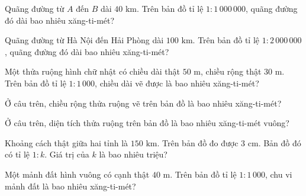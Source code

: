 \begin{ex}
  Quãng đường từ $A$ đến $B$ dài $40\text{ km}$. Trên bản đồ tỉ lệ $1 : 1\,000\,000$, quãng đường đó dài bao nhiêu xăng-ti-mét?
\end{ex}

\begin{ex}
  Quãng đường từ Hà Nội đến Hải Phòng dài $100\text{ km}$. Trên bản đồ tỉ lệ $1 : 2\,000\,000$, quãng đường đó dài bao nhiêu xăng-ti-mét?
\end{ex}

\begin{ex}
  Một thửa ruộng hình chữ nhật có chiều dài thật $50\text{ m}$, chiều rộng thật $30\text{ m}$. Trên bản đồ tỉ lệ $1 : 1\,000$, chiều dài vẽ được là bao nhiêu xăng-ti-mét?
\end{ex}

\begin{ex}
  Ở câu trên, chiều rộng thửa ruộng vẽ trên bản đồ là bao nhiêu xăng-ti-mét?
\end{ex}

\begin{ex}
  Ở câu trên, diện tích thửa ruộng trên bản đồ là bao nhiêu xăng-ti-mét vuông?
\end{ex}

\begin{ex}
  Khoảng cách thật giữa hai tỉnh là $150\text{ km}$. Trên bản đồ đo được $3\text{ cm}$. Bản đồ đó có tỉ lệ $1 : k$. Giá trị của $k$ là bao nhiêu triệu?
\end{ex}

\begin{ex}
  Một mảnh đất hình vuông có cạnh thật $40\text{ m}$. Trên bản đồ tỉ lệ $1 : 1\,000$, chu vi mảnh đất là bao nhiêu xăng-ti-mét?
\end{ex}

